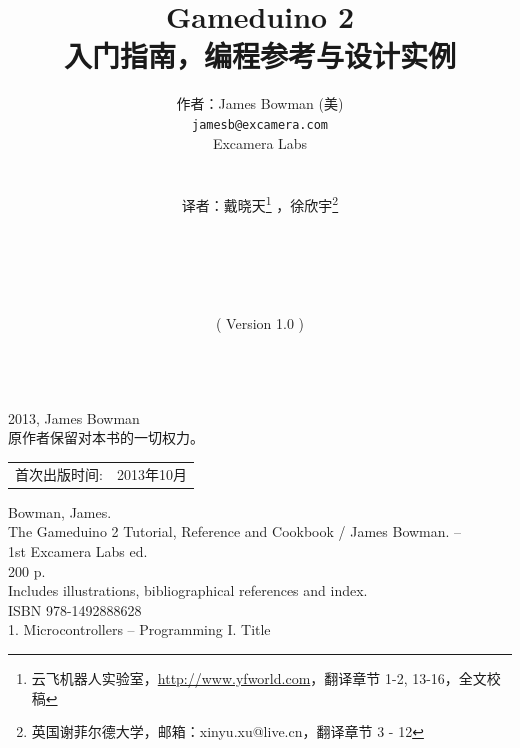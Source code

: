 \documentclass[10pt]{book}
\title{\LARGE \bf
Gameduino 2\\
入门指南，编程参考与设计实例
}
\author{作者：James Bowman (美) \\
	{\tt\small jamesb@excamera.com} \\
  Excamera Labs\\
   \\
   \\
  译者：戴晓天\footnote{云飞机器人实验室，\url{http://www.yfworld.com}，翻译章节 1-2, 13-16，全文校稿}
  ，徐欣宇\footnote{英国谢菲尔德大学，邮箱：xinyu.xu@live.cn，翻译章节 3 - 12}\\
  \\
  \\
  \\
  \\
  \\
  ( Version 1.0 )
  \\
  \\  
}
\date{}
\begin{document}
\begin{CJK}{UTF8}{gkai}
\maketitle

\begingroup
\footnotesize
\parindent 0pt
\parskip \baselineskip
\textcopyright{} 2013, James Bowman \\
原作者保留对本书的一切权力。

% 
% 
% 
% 

\begin{center}
\begin{tabular}{ll}
首次出版时间:  & 2013年10月 \\
\end{tabular}
\end{center}

\vfill

Bowman, James.\\
\hspace*{2em} The Gameduino 2 Tutorial, Reference and Cookbook / James Bowman. -- \\
\hspace*{1em} 1st Excamera Labs ed. \\
\hspace*{2em} 200 p. \hspace*{2em} \\
\hspace*{2em} Includes illustrations, bibliographical references and index. \\
\hspace*{2em} ISBN 978-1492888628 \\
\hspace*{2em} 1. Microcontrollers -- Programming \hspace*{2em} I. Title



\end{CJK}
\end{document}
